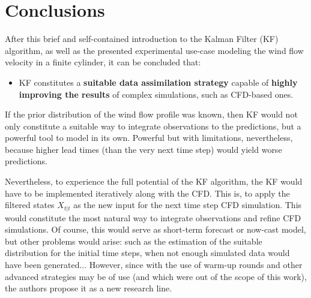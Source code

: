 \documentclass{article}
\theoremstyle{definition}
\theoremstyle{definition}
\theoremstyle{remark}
\theoremstyle{mythmstyle}
\begin{document}

\section{Conclusions}

After this brief and self-contained introduction to the Kalman Filter (KF) algorithm, as well as the presented experimental use-case modeling the wind flow velocity in a finite cylinder, it can be concluded that:
\begin{itemize}
    \item KF constitutes a \textbf{suitable data assimilation strategy} capable of \textbf{highly improving the results} of complex simulations, such as CFD-based ones. 
\end{itemize} 

If the prior distribution of the wind flow profile was known, then KF would not only constitute a suitable way to integrate observations to the predictions, but a powerful tool to model in its own. Powerful but with limitations, nevertheless, because higher lead times (than the very next time step) would yield worse predictions.

Nevertheless, to experience the full potential of the KF algorithm, the KF would have to be implemented iteratively along with the CFD. This is, to apply the filtered states $X_{t|t}$ as the new input for the next time step CFD simulation. 
This would constitute the most natural way to integrate observations and refine CFD simulations. Of course, this would serve as short-term forecast or now-cast model, but other problems would arise: such as the estimation of the suitable distribution for the initial time steps, when not enough simulated data would have been generated...
However, since with the use of warm-up rounds and other advanced strategies may be of use (and which were out of the scope of this work), the authors propose it as a new research line.






\end{document}
